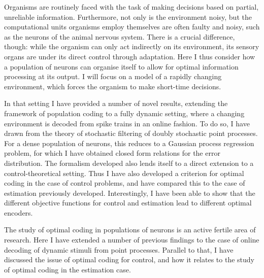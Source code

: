 
Organisms are routinely faced with the task of making decisions based on partial, unreliable information. Furthermore, not only is the environment noisy, but the computational units 
organisms employ themselves are often faulty and noisy, such as the neurons of the animal nervous system. There is a crucial difference, though: while the organism can only act
indirectly on its environment, its sensory organs are under its direct control through adaptation. Here I thus consider how a population of neurons can organise itself to allow for optimal information 
processing at its output. I will focus on a model of a rapidly changing environment, which forces the organism to make short-time decisions.\par

In that setting I have provided a number of novel results, extending the framework of population coding to a fully dynamic setting, where a changing environment is decoded from
spike trains in an online fashion. To do so, I have drawn from the theory of stochastic filtering of doubly stochastic point processes. For a dense population of neurons, this
reduces to a Gaussian process regression problem, for which I have obtained closed form relations for the error distribution. The formalism developed also lends itself to a direct 
extension to a control-theoretical setting. Thus I have also developed a criterion for optimal coding
in the case of control problems, and have compared this to the case of estimation previously developed. Interestingly, I have been able to show that the different objective functions
for control and estimation lead to different optimal encoders.\par

The study of optimal coding in populations of neurons is an active fertile area of research. Here I have extended a number of previous findings to the case of online decoding of
dynamic stimuli from point processes. Parallel to that, I have discussed the issue of optimal coding for control, and how it relates to the study of optimal coding in the estimation case.



